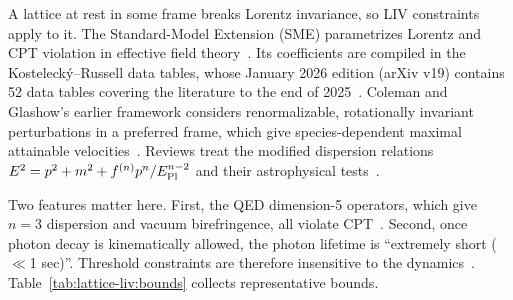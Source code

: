 A lattice at rest in some frame breaks Lorentz invariance, so LIV constraints apply to it. The Standard-Model Extension (SME) parametrizes Lorentz and CPT violation in effective field theory~\cite{Colladay1997cpt,Colladay1998lorentz}. Its coefficients are compiled in the Kosteleck\'y--Russell data tables, whose January 2026 edition (arXiv v19) contains 52 data tables covering the literature to the end of 2025~\cite{Kostelecky2011data}. Coleman and Glashow's earlier framework considers renormalizable, rotationally invariant perturbations in a preferred frame, which give species-dependent maximal attainable velocities~\cite{Coleman1999high}. Reviews treat the modified dispersion relations $E^2=p^2+m^2+f^{(n)}p^n/E_{\rm Pl}^{n-2}$ and their astrophysical tests~\cite{Mattingly2005modern,Jacobson2006lorentz,Liberati2013tests,Addazi2022quantum}.

Two features matter here. First, the QED dimension-5 operators, which give $n=3$ dispersion and vacuum birefringence, all violate CPT~\cite{Jacobson2006lorentz}. Second, once photon decay is kinematically allowed, the photon lifetime is ``extremely short ($\ll$1 sec)''. Threshold constraints are therefore insensitive to the dynamics~\cite{Jacobson2006lorentz}. Table~\ref{tab:lattice-liv:bounds} collects representative bounds.

